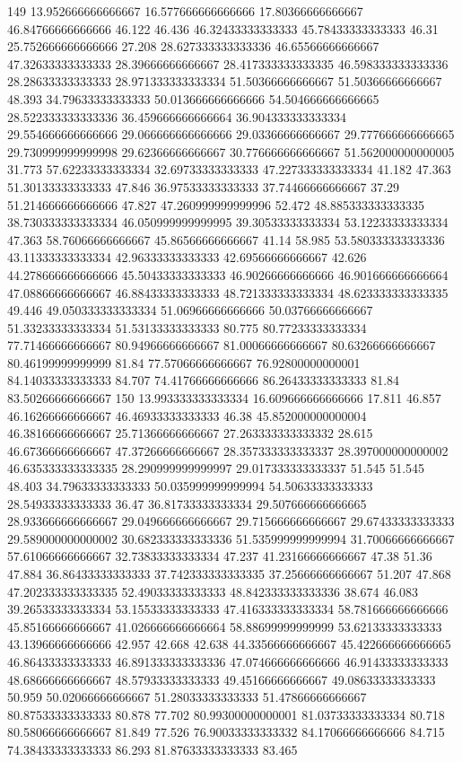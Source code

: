 149 13.952666666666667 16.577666666666666 17.80366666666667 46.84766666666666 46.122 46.436 46.32433333333333 45.78433333333333 46.31 25.752666666666666 27.208 28.627333333333336 46.65566666666667 47.32633333333333 28.39666666666667 28.417333333333335 46.598333333333336 28.28633333333333 28.971333333333334 51.50366666666667 51.50366666666667 48.393 34.79633333333333 50.013666666666666 54.504666666666665 28.522333333333336 36.459666666666664 36.904333333333334 29.554666666666666 29.066666666666666 29.03366666666667 29.777666666666665 29.730999999999998 29.62366666666667 30.776666666666667 51.562000000000005 31.773 57.62233333333334 32.69733333333333 47.227333333333334 41.182 47.363 51.30133333333333 47.846 36.97533333333333 37.74466666666667 37.29 51.214666666666666 47.827 47.260999999999996 52.472 48.885333333333335 38.730333333333334 46.050999999999995 39.30533333333334 53.12233333333334 47.363 58.76066666666667 45.86566666666667 41.14 58.985 53.580333333333336 43.11333333333334 42.96333333333333 42.69566666666667 42.626 44.278666666666666 45.50433333333333 46.90266666666666 46.901666666666664 47.08866666666667 46.88433333333333 48.721333333333334 48.623333333333335 49.446 49.050333333333334 51.06966666666666 50.03766666666667 51.33233333333334 51.53133333333333 80.775 80.77233333333334 77.71466666666667 80.94966666666667 81.00066666666667 80.63266666666667 80.46199999999999 81.84 77.57066666666667 76.92800000000001 84.14033333333333 84.707 74.41766666666666 86.26433333333333 81.84 83.50266666666667
150 13.993333333333334 16.609666666666666 17.811 46.857 46.16266666666667 46.46933333333333 46.38 45.852000000000004 46.38166666666667 25.71366666666667 27.263333333333332 28.615 46.67366666666667 47.37266666666667 28.357333333333337 28.397000000000002 46.635333333333335 28.290999999999997 29.017333333333337 51.545 51.545 48.403 34.79633333333333 50.035999999999994 54.50633333333333 28.54933333333333 36.47 36.81733333333334 29.507666666666665 28.933666666666667 29.049666666666667 29.715666666666667 29.67433333333333 29.589000000000002 30.682333333333336 51.535999999999994 31.70066666666667 57.61066666666667 32.73833333333334 47.237 41.23166666666667 47.38 51.36 47.884 36.86433333333333 37.742333333333335 37.25666666666667 51.207 47.868 47.202333333333335 52.49033333333333 48.842333333333336 38.674 46.083 39.26533333333334 53.15533333333333 47.416333333333334 58.781666666666666 45.85166666666667 41.026666666666664 58.88699999999999 53.62133333333333 43.13966666666666 42.957 42.668 42.638 44.33566666666667 45.422666666666665 46.86433333333333 46.891333333333336 47.074666666666666 46.91433333333333 48.68666666666667 48.57933333333333 49.45166666666667 49.08633333333333 50.959 50.02066666666667 51.28033333333333 51.47866666666667 80.87533333333333 80.878 77.702 80.99300000000001 81.03733333333334 80.718 80.58066666666667 81.849 77.526 76.90033333333332 84.17066666666666 84.715 74.38433333333333 86.293 81.87633333333333 83.465
